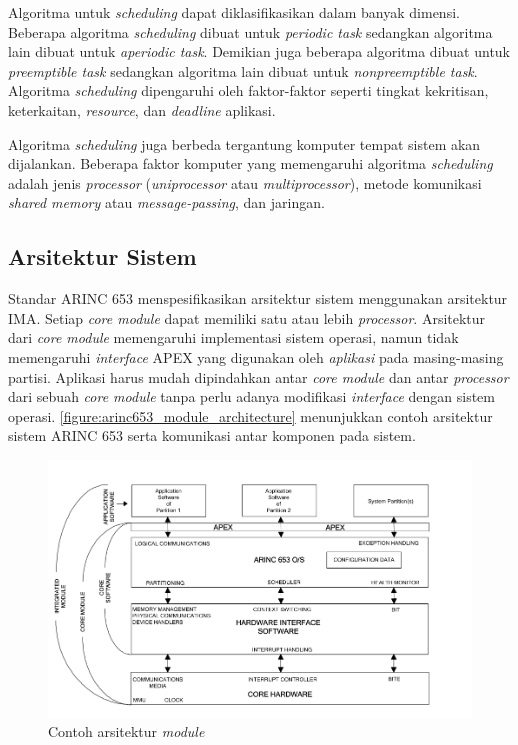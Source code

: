 Algoritma untuk \textit{scheduling} dapat diklasifikasikan dalam banyak dimensi.  Beberapa
algoritma \textit{scheduling} dibuat untuk \textit{periodic task} sedangkan algoritma lain
dibuat untuk \textit{aperiodic task}.  Demikian juga beberapa algoritma dibuat untuk
\textit{preemptible task} sedangkan algoritma lain dibuat untuk \textit{nonpreemptible task}.
Algoritma \textit{scheduling} dipengaruhi oleh faktor-faktor seperti tingkat kekritisan,
keterkaitan, \textit{resource}, dan \textit{deadline} aplikasi.

Algoritma \textit{scheduling} juga berbeda tergantung komputer tempat sistem akan dijalankan.
Beberapa faktor komputer yang memengaruhi algoritma \textit{scheduling} adalah jenis
\textit{processor} (\textit{uniprocessor} atau \textit{multiprocessor}), metode komunikasi
\textit{shared memory} atau \textit{message-passing}, dan jaringan.

\subsection{Arsitektur Sistem}

Standar ARINC 653 menspesifikasikan arsitektur sistem menggunakan arsitektur IMA.  Setiap
\textit{core module} dapat memiliki satu atau lebih \textit{processor}. Arsitektur dari
\textit{core module} memengaruhi implementasi sistem operasi, namun tidak memengaruhi
\textit{interface} APEX yang digunakan oleh \textit{aplikasi} pada masing-masing partisi.
Aplikasi harus mudah dipindahkan antar \textit{core module} dan antar \textit{processor} dari
sebuah \textit{core module} tanpa perlu adanya modifikasi \textit{interface} dengan sistem
operasi.  \autoref{figure:arinc653_module_architecture} menunjukkan contoh arsitektur sistem
ARINC 653 serta komunikasi antar komponen pada sistem.

\begin{figure}[htbp]
    \centering
    \includegraphics[scale=0.4]{resources/arinc653-architecture.png}
    \caption[Contoh arsitektur \textit{module}]{Contoh arsitektur \textit{module} \citep{AirlinesElectronicEngineeringCommittee2012}}
    \label{figure:arinc653_module_architecture}
\end{figure}

